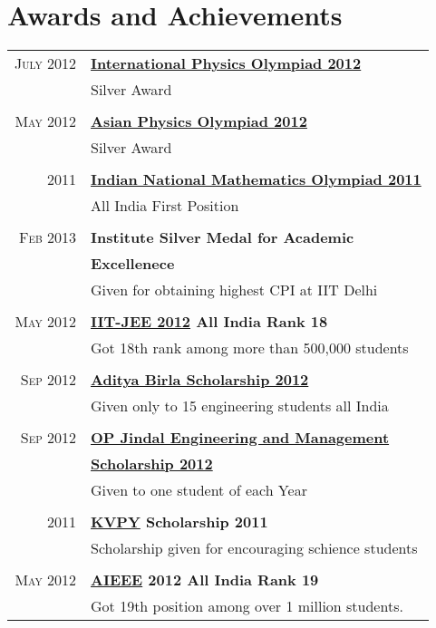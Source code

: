 \documentclass[10pt]{article} %
\begin{document}
{\begin{minipage}[t]{0.5\textwidth}
\section{Awards and Achievements} 
\begin{tabular}{rl}
\textsc{July 2012} & \textbf{\href{http://www.ipho2012.ee/silver-medalists/}{International Physics Olympiad 2012}}\\
& Silver Award\\\\
\textsc{May 2012} & \textbf{\href{http://www.apho2012india.org/apho-2012/results}{Asian Physics Olympiad 2012}}\\
& Silver Award\\\\
\textsc{2011} & \textbf{\href{http://olympiads.hbcse.tifr.res.in/subjects/mathematics/inmo-2011-awardees/at_download/file}{Indian National Mathematics Olympiad 2011}}\\
& All India First Position \\\\
\textsc{Feb 2013} & \textbf{Institute Silver Medal for Academic}\\ &  {\bf Excellenece }\\
& Given for obtaining highest CPI at IIT Delhi\\\\
\textsc{May 2012} & \textbf{\href{http://jee.iitd.ac.in/}{IIT-JEE 2012} All India Rank 18}\\
& Got 18th rank among more than 500,000 students\\\\
\textsc{Sep 2012} & \textbf{\href{http://www.adityabirlascholars.net/abgs_circle/2012.aspx}{Aditya Birla Scholarship 2012}}\\
& Given only to 15 engineering students all India\\\\
\textsc{Sep 2012} & \textbf{\href{http://www.opjems.com/opjems_scholars.aspx}{OP Jindal Engineering and Management }}\\ & \textbf{\href{http://www.opjems.com/opjems_scholars.aspx}{ Scholarship 2012}}\\
& Given to one student of each Year\\\\
\textsc{2011} & \textbf{\href{http://www.kvpy.org.in/main/}{KVPY} Scholarship 2011}\\
& Scholarship given for encouraging schience students \\\\
\textsc{May 2012} & \textbf{\href{http://aieee.nic.in/aieee2012/aieee/welcome.html}{AIEEE} 2012 All India Rank 19}\\
& Got 19th position among over 1 million students.
\end{tabular}


\end{minipage}}
\end{document}
